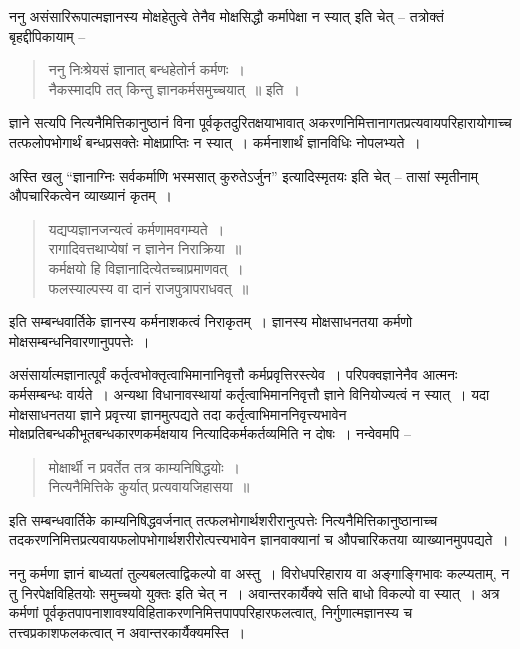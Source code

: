 {ननु असंसारिरूपात्मज्ञानस्य मोक्षहेतुत्वे तेनैव मोक्षसिद्धौ कर्मापेक्षा न स्यात् इति चेत् – तत्रोक्तं बृहद्दीपिकायाम् –
\begin{verse}
ननु निःश्रेयसं ज्ञानात् बन्धहेतोर्न कर्मणः~। \\
नैकस्मादपि तत् किन्तु ज्ञानकर्मसमुच्चयात्~॥ इति~। 
\end{verse}
ज्ञाने सत्यपि नित्यनैमित्तिकानुष्ठानं विना पूर्वकृतदुरितक्षयाभावात् अकरणनिमित्तानागतप्रत्यवायपरिहारायोगाच्च तत्फलोपभोगार्थं बन्धप्रसक्तेः मोक्षप्राप्तिः न स्यात्~। कर्मनाशार्थं ज्ञानविधिः नोपलभ्यते~। 

अस्ति खलु “ज्ञानाग्निः सर्वकर्माणि भस्मसात् कुरुतेऽर्जुन” इत्यादिस्मृतयः इति चेत् – तासां स्मृतीनाम् औपचारिकत्वेन व्याख्यानं कृतम्~। 
\begin{verse}
यद्यप्यज्ञानजन्यत्वं कर्मणामवगम्यते~। \\
रागादिवत्तथाप्येषां न ज्ञानेन निराक्रिया~॥\\
कर्मक्षयो हि विज्ञानादित्येतच्चाप्रमाणवत्~। \\
फलस्याल्पस्य वा दानं राजपुत्रापराधवत्~॥
\end{verse}
इति सम्बन्धवार्तिके ज्ञानस्य कर्मनाशकत्वं निराकृतम्~। ज्ञानस्य मोक्षसाधनतया कर्मणो मोक्षसम्बन्धनिवारणानुपपत्तेः~। 

असंसार्यात्मज्ञानात्पूर्वं कर्तृत्वभोक्तृत्वाभिमानानिवृत्तौ कर्मप्रवृत्तिरस्त्येव~। परिपक्वज्ञानेनैव आत्मनः कर्मसम्बन्धः वार्यते~। अन्यथा विधानावस्थायां कर्तृत्वाभिमाननिवृत्तौ ज्ञाने विनियोज्यत्वं न स्यात्~। यदा मोक्षसाधनतया ज्ञाने प्रवृत्त्या ज्ञानमुत्पद्यते तदा कर्तृत्वाभिमाननिवृत्त्यभावेन मोक्षप्रतिबन्धकीभूतबन्धकारणकर्मक्षयाय नित्यादिकर्मकर्तव्यमिति न दोषः~। नन्वेवमपि –
\begin{verse}
मोक्षार्थी न प्रवर्तेत तत्र काम्यनिषिद्धयोः~। \\
नित्यनैमित्तिके कुर्यात् प्रत्यवायजिहासया~॥
\end{verse}
इति सम्बन्धवार्तिके काम्यनिषिद्धवर्जनात् तत्फलभोगार्थशरीरानुत्पत्तेः नित्यनैमित्तिकानुष्ठानाच्च तदकरणनिमित्तप्रत्यवायफलोपभोगार्थशरीरोत्पत्त्यभावेन ज्ञानवाक्यानां च औपचारिकतया व्याख्यानमुपपद्यते~। 

ननु कर्मणा ज्ञानं बाध्यतां तुल्यबलत्वाद्विकल्पो वा अस्तु~। विरोधपरिहाराय वा अङ्गाङ्गिभावः कल्प्यताम्, न तु निरपेक्षविहितयोः समुच्चयो युक्तः इति चेत् न~। अवान्तरकार्यैक्ये सति बाधो विकल्पो वा स्यात्~। अत्र कर्मणां पूर्वकृतपापनाशावश्यविहिताकरणनिमित्तपापपरिहारफलत्वात्, निर्गुणात्मज्ञानस्य च तत्त्वप्रकाशफलकत्वात् न अवान्तरकार्यैक्यमस्ति~। 

}
